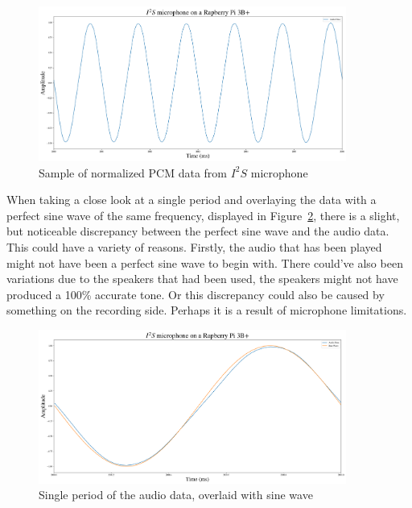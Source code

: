 \begin{figure}[H]
    \centering
    \includegraphics[width=0.9\textwidth]{figures/i2s/i2s_data_recording.png}
    \caption[Sample of normalized PCM data from $I^2S$ microphone]{Sample of normalized PCM data from $I^2S$ microphone}
    \label{fig:i2s_section}
\end{figure}

When taking a close look at a single period and overlaying the data with a perfect sine wave of the same
frequency, displayed in Figure~\ref{fig:i2s_period}, there is a slight, but noticeable discrepancy between the perfect sine
wave and the audio data.
This could have a variety of reasons.
Firstly, the audio that has been played might not have been a perfect sine wave to begin with.
There could've also been variations due to the speakers that had been used, the speakers
might not have produced a 100\% accurate tone.
Or this discrepancy could also be caused by something on the recording side.
Perhaps it is a result of microphone limitations.

\begin{figure}[H]
    \centering
    \includegraphics[width=0.9\textwidth]{figures/i2s/i2s_one_period.png}
    \caption[A single period of the normalized audio data, overlaid with a perfect sine wave of the same frequency]{Single period of the audio data, overlaid with sine wave}
    \label{fig:i2s_period}
\end{figure}


